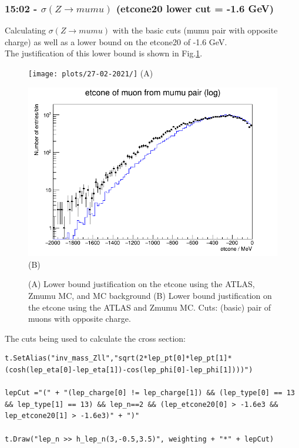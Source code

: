 \subsubsection*{15:02 - $\sigma(Z \rightarrow mumu)$ (etcone20 lower cut = -1.6 GeV)}
Calculating $\sigma(Z \rightarrow mumu)$ with the basic cuts (mumu pair with opposite charge) as well as a lower bound on the etcone20 of -1.6 GeV.  
\\
The justification of this lower bound is shown in Fig.\ref{fig:Stack-Zmumu-etcone-lower-bound-justification_27-02-21_14-52}.
\begin{figure}[h!]
    \centering
    \begin{minipage}{0.5\textwidth}
        \centering
        \texttt{[image: plots/27-02-2021/]}
        (A)
    \end{minipage}\hfill
    \begin{minipage}{0.5\textwidth}
        \centering
        \includegraphics[width=\linewidth]{plots/27-02-2021/2-Stack-Zmumu-etcone-lower-bound-justification_27-02-21_14-52.png}
        (B)
    \end{minipage}
    \caption{(A) Lower bound justification on the etcone using the ATLAS, Zmumu MC, and MC background (B) Lower bound justification on the etcone using the ATLAS and Zmumu MC.  Cuts: (basic) pair of muons with opposite charge.}
    \label{fig:Stack-Zmumu-etcone-lower-bound-justification_27-02-21_14-52}
\end{figure}

The cuts being used to calculate the cross section:
\begin{lstlisting}
t.SetAlias("inv_mass_Zll","sqrt(2*lep_pt[0]*lep_pt[1]*(cosh(lep_eta[0]-lep_eta[1])-cos(lep_phi[0]-lep_phi[1])))")
    
lepCut ="(" + "(lep_charge[0] != lep_charge[1]) && (lep_type[0] == 13 && lep_type[1] == 13) && lep_n==2 && (lep_etcone20[0] > -1.6e3 && lep_etcone20[1] > -1.6e3)" + ")"    
  
t.Draw("lep_n >> h_lep_n(3,-0.5,3.5)", weighting + "*" + lepCut)
\end{lstlisting}


